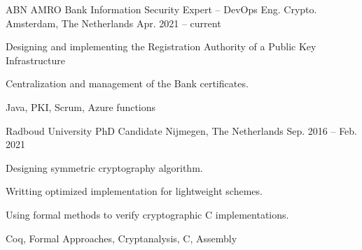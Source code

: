 

\begin{cventries}

	\cventrysix%
	{ABN AMRO Bank} %
	{Information Security Expert -- DevOps Eng. Crypto.} %
	{Amsterdam, The Netherlands} %
	{Apr. 2021 -- current} %
	{
		\begin{cvitems} %
			\item {Designing and implementing the Registration Authority of a Public Key Infrastructure} %
			\item {Centralization and management of the Bank certificates.}
		\end{cvitems}
	}%
	{Java, PKI, Scrum, Azure functions}%


	\cventrysix%
	{Radboud University} %
	{PhD Candidate} %
	{Nijmegen, The Netherlands} %
	{Sep. 2016 -- Feb. 2021} %
	{
		\begin{cvitems} %
			\item {Designing symmetric cryptography algorithm.} %
			\item {Writting optimized implementation for lightweight schemes.} %
			\item {Using formal methods to verify cryptographic C implementations.} %
		\end{cvitems}
	}%
	{Coq, Formal Approaches, Cryptanalysis, C, Assembly}%



\end{cventries}
